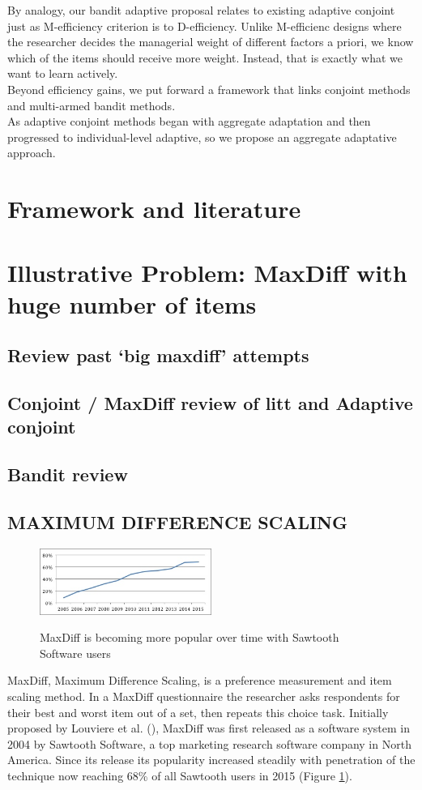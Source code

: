 \documentclass[mksc,blindrev]{informs3} %
\begin{document}
By analogy, our bandit adaptive proposal relates to existing adaptive conjoint just as M-efficiency criterion is to D-efficiency.  Unlike M-efficienc designs where the researcher decides the managerial weight of different factors a priori, we know which of the items should receive more weight. Instead, that is exactly what we want to learn actively. \\

Beyond efficiency gains, we put forward a framework that links conjoint methods and multi-armed bandit methods. \\

As adaptive conjoint methods began with aggregate adaptation and then progressed to individual-level adaptive, so we propose an aggregate adaptative approach. \\
\section{Framework and literature}
\section{Illustrative Problem: MaxDiff with huge number of items}
\subsection{Review past ‘big maxdiff’ attempts}
\subsection{Conjoint / MaxDiff review of litt and Adaptive conjoint}
\subsection{Bandit review}
\subsection{MAXIMUM DIFFERENCE SCALING}
\begin{figure}[!ht]
\caption{MaxDiff is becoming more popular over time with Sawtooth Software users}
\includegraphics[width=0.5\textwidth]{plots/maxdiffpop}
\label{fig:pop}
\end{figure}
MaxDiff, Maximum Difference Scaling, is a preference measurement and item scaling method.  In a MaxDiff questionnaire the researcher asks respondents for their best and worst item out of a set, then repeats this choice task. Initially proposed by Louviere et al. (), MaxDiff was first released as a software system in 2004 by Sawtooth Software, a top marketing research software company in North America. Since its release its popularity increased steadily with penetration of the technique now reaching 68\% of all Sawtooth users in 2015 (Figure \ref{fig:pop}). \\
\end{document}

